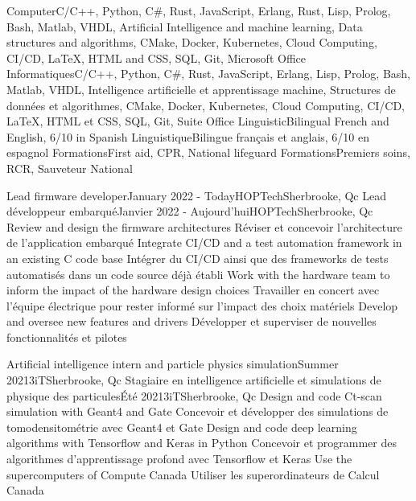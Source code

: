     \resumeEnumerationStart
        \resumeEnumerationEnFr
            {Computer}{C/C++, Python, C\#, Rust, JavaScript, Erlang, Rust, Lisp, Prolog, Bash, Matlab, VHDL, Artificial Intelligence and machine learning, Data structures and algorithms, CMake, Docker, Kubernetes, Cloud Computing, CI/CD, LaTeX, HTML and CSS, SQL, Git, Microsoft Office}
            {Informatiques}{C/C++, Python, C\#, Rust, JavaScript, Erlang, Lisp, Prolog, Bash, Matlab, VHDL, Intelligence artificielle et apprentissage machine, Structures de données et algorithmes, CMake, Docker, Kubernetes, Cloud Computing, CI/CD, LaTeX, HTML et CSS, SQL, Git, Suite Office}
        \resumeEnumerationEnFr
            {Linguistic}{Bilingual French and English, 6/10 in Spanish}
            {Linguistique}{Bilingue français et anglais, 6/10 en espagnol}
        \resumeEnumerationEnFr
            {Formations}{First aid, CPR, National lifeguard}
            {Formations}{Premiers soins, RCR, Sauveteur National}
    \resumeEnumerationEnd


  \resumeSubHeadingListStart
      \resumeSubheadingEnFr
        {Lead firmware developer}{January 2022 - Today}{HOPTech}{Sherbrooke, Qc}
        {Lead développeur embarqué}{Janvier 2022 - Aujourd'hui}{HOPTech}{Sherbrooke, Qc}
            \resumeItemListStart
                \resumeItemEnFr
                    {Review and design the firmware architectures}
                    {Réviser et concevoir l'architecture de l'application embarqué}
                \resumeItemEnFr
                    {Integrate CI/CD and a test automation framework in an existing C code base}
                    {Intégrer du CI/CD ainsi que des frameworks de tests automatisés dans un code source déjà établi}
                \resumeItem
                    {Work with the hardware team to inform the impact of the hardware design choices}
                    {Travailler en concert avec l'équipe électrique pour rester informé sur l'impact des choix matériels}
                \resumeItem
                    {Develop and oversee new features and drivers}
                    {Développer et superviser de nouvelles fonctionnalités et pilotes}
            \resumeItemListEnd
  
    \resumeSubheadingEnFr
        {Artificial intelligence intern and particle physics simulation}{Summer 2021}{3iT}{Sherbrooke, Qc}
        {Stagiaire en intelligence artificielle et simulations de physique des particules}{Été 2021}{3iT}{Sherbrooke, Qc}
            \resumeItemListStart
                \resumeItemEnFr
                    {Design and code Ct-scan simulation with Geant4 and Gate}
                    {Concevoir et développer des simulations de tomodensitométrie avec Geant4 et Gate}
                \resumeItemEnFr
                    {Design and code deep learning algorithms with Tensorflow and Keras in Python}
                    {Concevoir et programmer des algorithmes d’apprentissage profond avec Tensorflow et Keras}
                \resumeItem
                    {Use the supercomputers of Compute Canada}
                    {Utiliser les superordinateurs de Calcul Canada}
            \resumeItemListEnd

